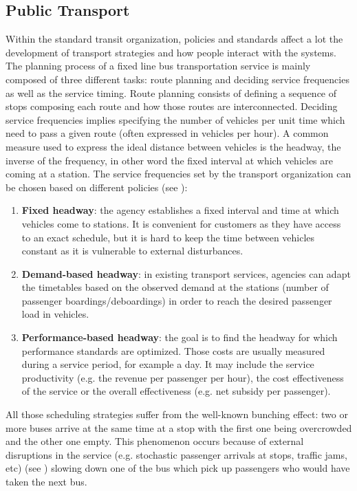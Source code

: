 \documentclass[12pt,a4paper]{article}
\begin{document}
\subsection{Public Transport}\label{pubtrans}
Within the standard transit organization, policies and standards affect a lot the development of transport strategies and how people interact with the systems. The planning process of a fixed line bus transportation service is mainly composed of three different tasks: route planning and deciding service frequencies as well as the service timing. Route planning consists of defining a sequence of stops composing each route and how those routes are interconnected. Deciding service frequencies implies specifying the number of vehicles per unit time which need to pass a given route (often expressed in vehicles per hour). A common measure used to express the ideal distance between vehicles is the headway, the inverse of the frequency, in other word the fixed interval at which vehicles are coming at a station. The service frequencies set by the transport organization can be chosen based on different policies (see \cite{tcrp}): 
\begin{enumerate}
\item \textbf{Fixed headway}: the agency establishes a fixed interval and time at which vehicles come to stations. It is convenient for customers as they have access to an exact schedule, but it is hard to keep the time between vehicles constant as it is vulnerable to external disturbances.
\item \textbf{Demand-based headway}: in existing transport services, agencies can adapt the timetables based on the observed demand at the stations (number of passenger boardings/deboardings) in order to reach the desired passenger load in vehicles.
\item \textbf{Performance-based headway}: the goal is to find the headway for which performance standards are optimized. Those costs are usually measured during a service period, for example a day. It may include the service productivity (e.g. the revenue per passenger per hour), the cost effectiveness of the service or the overall effectiveness (e.g. net subsidy per passenger). 
\end{enumerate}

All those scheduling strategies suffer from the well-known bunching effect: two or more buses arrive at the same time at a stop with the first one being overcrowded and the other one empty. This phenomenon occurs because of external disruptions in the service (e.g. stochastic passenger arrivals at stops, traffic jams, etc) (see \cite{hwadherence}) slowing down one of the bus which pick up passengers who would have taken the next bus. 
\end{document}
